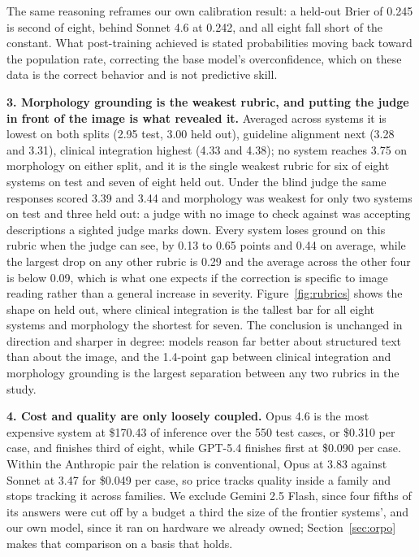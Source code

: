 \documentclass[11pt]{article}
\begin{document}
The same reasoning reframes our own calibration result: a held-out Brier of 0.245
is second of eight, behind Sonnet 4.6 at 0.242, and all eight fall short of the
constant. What post-training achieved is stated probabilities moving back toward
the population rate, correcting the base model's overconfidence, which on these
data is the correct behavior and is not predictive skill.

\textbf{3. Morphology grounding is the weakest rubric, and putting the judge in
front of the image is what revealed it.} Averaged across systems it is lowest on
both splits (2.95 test, 3.00 held out), guideline alignment next (3.28 and 3.31),
clinical integration highest (4.33 and 4.38); no system reaches 3.75 on
morphology on either split, and it is the single weakest rubric for six of eight
systems on test and seven of eight held out. Under the blind judge the same
responses scored 3.39 and 3.44 and morphology was weakest for only two systems on
test and three held out: a judge with no image to check against was accepting
descriptions a sighted judge marks down. Every system loses ground on this rubric
when the judge can see, by 0.13 to 0.65 points and 0.44 on average, while the
largest drop on any other rubric is 0.29 and the average across the other four is
below 0.09, which is what one expects if the correction is specific to image
reading rather than a general increase in severity.
Figure~\ref{fig:rubrics} shows the shape on held out, where clinical integration
is the tallest bar for all eight systems and morphology the shortest for seven.
The conclusion is unchanged in direction and sharper in degree: models reason far
better about structured text than about the image, and the 1.4-point gap between
clinical integration and morphology grounding is the largest separation between
any two rubrics in the study.

\textbf{4. Cost and quality are only loosely coupled.} Opus 4.6 is the most
expensive system at \$170.43 of inference over the 550 test cases, or \$0.310 per
case, and finishes third of eight, while GPT-5.4 finishes first at \$0.090 per
case. Within the Anthropic pair the relation is conventional, Opus at 3.83
against Sonnet at 3.47 for \$0.049 per case, so price tracks quality inside a
family and stops tracking it across families. We exclude Gemini 2.5 Flash, since
four fifths of its answers were cut off by a budget a third the size of the
frontier systems', and our own model, since it ran on hardware we already owned;
Section~\ref{sec:orpo} makes that comparison on a basis that holds.
\end{document}
